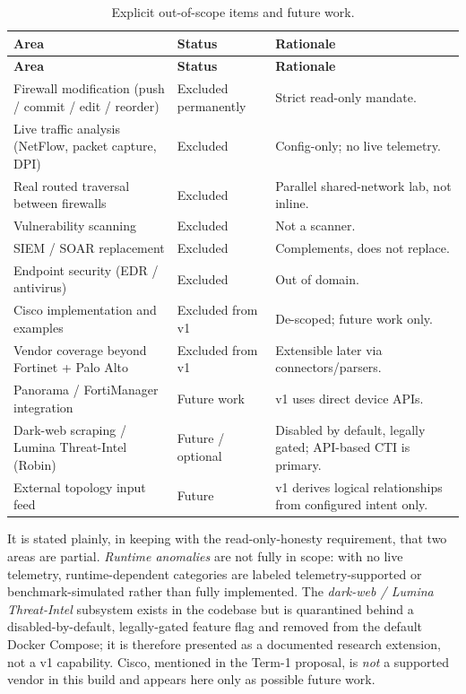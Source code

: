 \documentclass[12pt,a4paper]{report}
\renewcommand{\_}{\textunderscore\allowbreak}
\newcommand{\hcell}[1]{\textbf{#1}}
\begin{document}
\begin{longtable}{L{0.40\textwidth} L{0.24\textwidth} L{0.28\textwidth}}
\caption{Explicit out-of-scope items and future work.}\label{tab:ch1-scope-out}\\
\hline
\hcell{Area} & \hcell{Status} & \hcell{Rationale} \\ \hline
\endfirsthead
\hline
\hcell{Area} & \hcell{Status} & \hcell{Rationale} \\ \hline
\endhead
Firewall modification (push / commit / edit / reorder) & Excluded permanently & Strict read-only mandate. \\
Live traffic analysis (NetFlow, packet capture, DPI) & Excluded & Config-only; no live telemetry. \\
Real routed traversal between firewalls & Excluded & Parallel shared-network lab, not inline. \\
Vulnerability scanning & Excluded & Not a scanner. \\
SIEM / SOAR replacement & Excluded & Complements, does not replace. \\
Endpoint security (EDR / antivirus) & Excluded & Out of domain. \\
Cisco implementation and examples & Excluded from v1 & De-scoped; future work only. \\
Vendor coverage beyond Fortinet + Palo Alto & Excluded from v1 & Extensible later via connectors/parsers. \\
Panorama / FortiManager integration & Future work & v1 uses direct device APIs. \\
Dark-web scraping / Lumina Threat-Intel (Robin) & Future / optional & Disabled by default, legally gated; API-based CTI is primary. \\
External topology input feed & Future & v1 derives logical relationships from configured intent only. \\ \hline
\end{longtable}

It is stated plainly, in keeping with the read-only-honesty requirement, that two areas are partial. \emph{Runtime anomalies} are not fully in scope: with no live telemetry, runtime-dependent categories are labeled telemetry-supported or benchmark-simulated rather than fully implemented. The \emph{dark-web / Lumina Threat-Intel} subsystem exists in the codebase but is quarantined behind a disabled-by-default, legally-gated feature flag and removed from the default Docker Compose; it is therefore presented as a documented research extension, not a v1 capability. Cisco, mentioned in the Term-1 proposal, is \emph{not} a supported vendor in this build and appears here only as possible future work.
\end{document}
